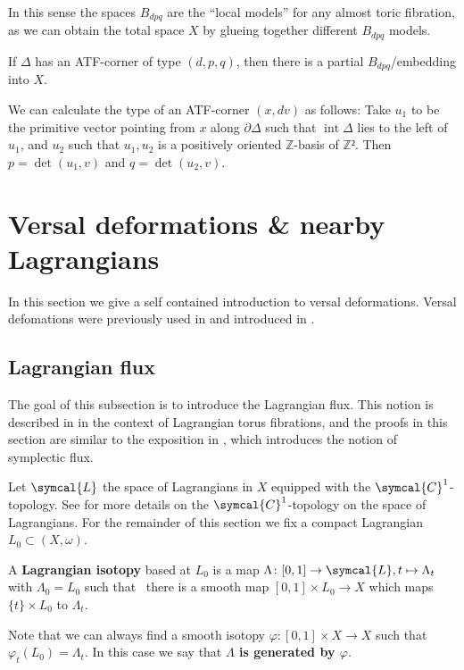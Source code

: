 \documentclass[AIF,Unicode,manuscript]{cedram}
\DeclareMathOperator{\interior}{int}
\begin{document}
In this sense the spaces $B_{dpq}$ are the ``local models'' for any almost toric fibration, as we can obtain the total space $X$ by glueing together different $B_{dpq}$ models.

\begin{lemma}
  \label{thm:atf_bdpq}
  If $Δ$ has an ATF-corner of type $(d,p,q)$, then there is a partial $B_{dpq}$\-/embedding into $X$.
\end{lemma}

\begin{remark}
  \label{rem:atf_corner_type_calc}
  We can calculate the type of an ATF-corner $(x,dv)$ as follows: Take $u_1$ to be the primitive vector pointing from $x$ along $∂Δ$ such that $\interior{Δ}$ lies to the left of $u_1$, and $u_2$ such that $u_1,u_2$ is a positively oriented $ℤ$-basis of $ℤ²$.
Then $p=\det(u_1,v)$ and $q = \det(u_2,v)$.
\end{remark}

\section{Versal deformations \& nearby Lagrangians}
\label{sec:vds}

In this section we give a self contained introduction to versal deformations.
Versal defomations were previously used in \cite{brendel2020real,brendel2023local,CheSch10} and introduced in \cite{Che96}.

\subsection{Lagrangian flux}
\label{sec:lagflux}

The goal of this subsection is to introduce the Lagrangian flux.
This notion is described in \cite[Section 2.4]{evans2021atfs} in the context of Lagrangian torus fibrations, and the proofs in this section are similar to the exposition in \cite[Section 10.2]{McDuffSalamonSympTop}, which introduces the notion of symplectic flux.

Let $\symcal{L}$ the space of Lagrangians in $X$ equipped with the $\symcal{C}^1$-topology.
See \cite{ono2008LagrangianFlux} for more details on the $\symcal{C}^1$-topology on the space of Lagrangians. 
For the remainder of this section we fix a compact Lagrangian $L_0 ⊂ (X,ω)$.

\begin{definition}
  A \textbf{Lagrangian isotopy} based at $L_0$ is a map $\Lambda \colon [0,1] \rightarrow \symcal{L}, t \mapsto \Lambda_t$ with $\Lambda_0 = L_0$ such that \ there is a smooth map $[0,1] \times L_0 \rightarrow X$ which maps $\{t\} \times L_0$ to $\Lambda_t$.

  Note that we can always find a smooth isotopy $φ \colon [0,1] × X → X$ such that\ $φ_t(L_0) = Λ_t$.
  In this case we say that \textbf{$Λ$ is generated by $φ$}.
\end{definition}
\end{document}
